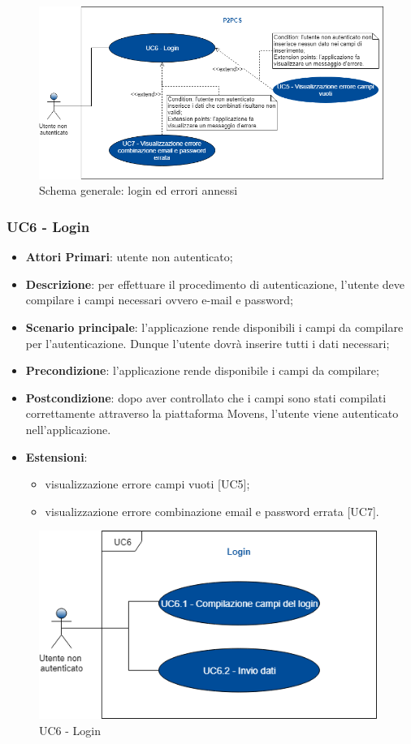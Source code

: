 \begin{figure}[h]
	\includegraphics[width=16cm]{res/images/Schemagenerale2.png}
	\centering
	\caption{Schema generale: login ed errori annessi}
\end{figure}
\newpage
\subsubsection{UC6 - Login}
\begin{itemize}
	\item \textbf{Attori Primari}: utente non autenticato;
	\item \textbf{Descrizione}: per effettuare il procedimento di autenticazione, l'utente deve compilare i campi necessari ovvero e-mail e password;
	\item \textbf{Scenario principale}: l'applicazione rende disponibili i campi da compilare per l'autenticazione. Dunque l'utente dovrà inserire tutti i dati necessari;
	\item \textbf{Precondizione}: l'applicazione rende disponibile i campi da compilare;
	\item \textbf{Postcondizione}: dopo aver controllato che i campi sono stati compilati correttamente attraverso la piattaforma Movens\glo, l'utente viene autenticato nell'applicazione.
	\item \textbf{Estensioni}:
		\begin{itemize}
			\item visualizzazione errore campi vuoti [UC5];
			\item visualizzazione errore combinazione email e password errata [UC7].
		\end{itemize}	
\end{itemize}
\begin{figure}[h]
	\includegraphics[width=11cm]{res/images/UC6Login.png}
	\centering
	\caption{UC6 - Login}
\end{figure}
\newpage
